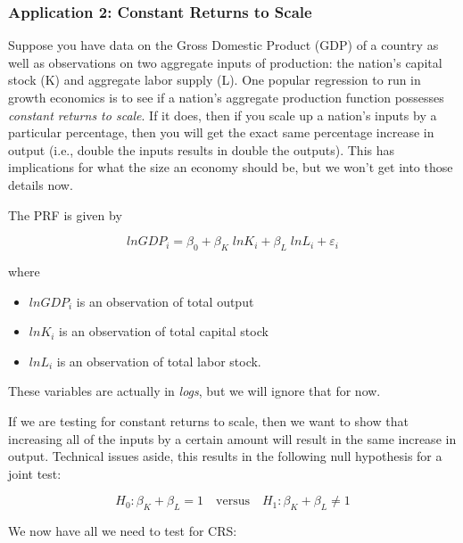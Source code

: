 \documentclass[
]{book}
\newenvironment{Shaded}{\begin{snugshade}}{\end{snugshade}}
\newcommand{\AttributeTok}[1]{\textcolor[rgb]{0.77,0.63,0.00}{#1}}
\newcommand{\CommentTok}[1]{\textcolor[rgb]{0.56,0.35,0.01}{\textit{#1}}}
\newcommand{\FunctionTok}[1]{\textcolor[rgb]{0.00,0.00,0.00}{#1}}
\newcommand{\NormalTok}[1]{#1}
\newcommand{\OtherTok}[1]{\textcolor[rgb]{0.56,0.35,0.01}{#1}}
\newcommand{\SpecialCharTok}[1]{\textcolor[rgb]{0.00,0.00,0.00}{#1}}
\newcommand{\StringTok}[1]{\textcolor[rgb]{0.31,0.60,0.02}{#1}}
\begin{document}
\hypertarget{application-2-constant-returns-to-scale}{%
\subsubsection*{Application 2: Constant Returns to Scale}\label{application-2-constant-returns-to-scale}}

Suppose you have data on the Gross Domestic Product (GDP) of a country as well as observations on two aggregate inputs of production: the nation's capital stock (K) and aggregate labor supply (L). One popular regression to run in growth economics is to see if a nation's aggregate production function possesses \emph{constant returns to scale}. If it does, then if you scale up a nation's inputs by a particular percentage, then you will get the exact same percentage increase in output (i.e., double the inputs results in double the outputs). This has implications for what the size an economy should be, but we won't get into those details now.

The PRF is given by

\[lnGDP_i = \beta_0 + \beta_K \;lnK_i + \beta_L \;lnL_i + \varepsilon_i\]

where

\begin{itemize}
\item
  \(lnGDP_i\) is an observation of total output
\item
  \(lnK_i\) is an observation of total capital stock
\item
  \(lnL_i\) is an observation of total labor stock.
\end{itemize}

These variables are actually in \emph{logs}, but we will ignore that for now.

If we are testing for constant returns to scale, then we want to show that increasing all of the inputs by a certain amount will result in the same increase in output. Technical issues aside, this results in the following null hypothesis for a joint test:

\[H_0: \beta_K + \beta_L = 1 \quad \text{versus} \quad H_1: \beta_K + \beta_L \neq 1\]

We now have all we need to test for CRS:

\begin{Shaded}
\end{Shaded}
\end{document}
